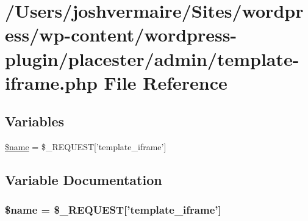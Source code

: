 \hypertarget{template-iframe_8php}{
\section{/Users/joshvermaire/Sites/wordpress/wp-\/content/wordpress-\/plugin/placester/admin/template-\/iframe.php File Reference}
\label{dd/dbe/template-iframe_8php}
}
\subsection*{Variables}
\begin{DoxyCompactItemize}
\item 
\hyperlink{template-iframe_8php_ab2fc40d43824ea3e1ce5d86dee0d763b}{\$name} = \$\_\-REQUEST\mbox{[}'template\_\-iframe'\mbox{]}
\end{DoxyCompactItemize}


\subsection{Variable Documentation}
\hypertarget{template-iframe_8php_ab2fc40d43824ea3e1ce5d86dee0d763b}{
\subsubsection[{\$name}]{\setlength{\rightskip}{0pt plus 5cm}\$name = \$\_\-REQUEST\mbox{[}'template\_\-iframe'\mbox{]}}}
\label{dd/dbe/template-iframe_8php_ab2fc40d43824ea3e1ce5d86dee0d763b}
